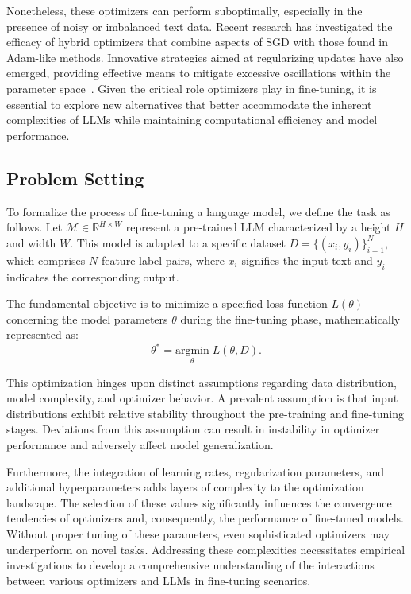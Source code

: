 \documentclass{article} %
\begin{document}
Nonetheless, these optimizers can perform suboptimally, especially in the presence of noisy or imbalanced text data. Recent research has investigated the efficacy of hybrid optimizers that combine aspects of SGD with those found in Adam-like methods. Innovative strategies aimed at regularizing updates have also emerged, providing effective means to mitigate excessive oscillations within the parameter space~\cite{loshchilov2017decoupled}. Given the critical role optimizers play in fine-tuning, it is essential to explore new alternatives that better accommodate the inherent complexities of LLMs while maintaining computational efficiency and model performance.

\subsection{Problem Setting}
To formalize the process of fine-tuning a language model, we define the task as follows. Let $\mathcal{M} \in \mathbb{R}^{H \times W}$ represent a pre-trained LLM characterized by a height $H$ and width $W$. This model is adapted to a specific dataset $D = \{ (x_i, y_i) \}_{i=1}^N$, which comprises $N$ feature-label pairs, where $x_i$ signifies the input text and $y_i$ indicates the corresponding output.

The fundamental objective is to minimize a specified loss function $L(\theta)$ concerning the model parameters $\theta$ during the fine-tuning phase, mathematically represented as:
\begin{equation}
\theta^* = \underset{\theta}{\text{argmin}} \; L(\theta, D).
\end{equation}

This optimization hinges upon distinct assumptions regarding data distribution, model complexity, and optimizer behavior. A prevalent assumption is that input distributions exhibit relative stability throughout the pre-training and fine-tuning stages. Deviations from this assumption can result in instability in optimizer performance and adversely affect model generalization. 

Furthermore, the integration of learning rates, regularization parameters, and additional hyperparameters adds layers of complexity to the optimization landscape. The selection of these values significantly influences the convergence tendencies of optimizers and, consequently, the performance of fine-tuned models. Without proper tuning of these parameters, even sophisticated optimizers may underperform on novel tasks. Addressing these complexities necessitates empirical investigations to develop a comprehensive understanding of the interactions between various optimizers and LLMs in fine-tuning scenarios.
\end{document}

